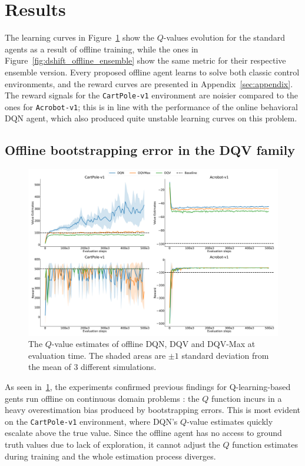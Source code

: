 \section{Results}\label{sec:results}
The learning curves in Figure~\ref{fig:dshift_offline_normal} show the
$Q$-values evolution for the standard agents as a result of offline
training, while the ones in Figure~\ref{fig:dshift_offline_ensemble}
show the same metric for their respective ensemble version. Every
proposed offline agent learns to solve both classic control
environments, and the reward curves are presented in
Appendix~\ref{sec:appendix}.
The reward signals for the \texttt{CartPole-v1} environment are
noisier compared to the ones for \texttt{Acrobot-v1}; this is in line
with the performance of the online behavioral DQN agent, which also
produced quite unstable learning curves on this problem.

\subsection{Offline bootstrapping error in the DQV family}
\begin{figure}[!tbp]
  \centering
  \includegraphics[width=.5\textwidth]{img/dshift_plots_normal.png}
  \caption{The $Q$-value estimates of offline DQN, DQV and DQV-Max at
    evaluation time. The shaded areas are $\pm 1$ standard deviation
    from the mean of 3 different
    simulations.}\label{fig:dshift_offline_normal}
\end{figure}
As seen in~\ref{fig:dshift_offline_normal}, the experiments confirmed
previous findings for Q-learning-based gents run offline on continuous
domain problems \citep{pmlr-v97-fujimoto19a,kumar2019stabilizing}: the
$Q$ function incurs in a heavy overestimation bias produced by
bootstrapping errors. This is most evident on the \texttt{CartPole-v1}
environment, where DQN's $Q$-value estimates quickly escalate above
the true value. Since the offline agent has no access to ground truth
values due to lack of exploration, it cannot adjust the $Q$ function
estimates during training and the whole estimation process diverges.

